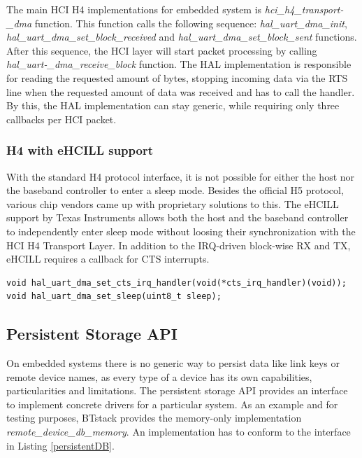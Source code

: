 \documentclass[a4paper,titlepage,oneside,12pt]{amsart} %
\begin{document}
The main HCI H4 implementations for embedded system is \emph{hci\_h4\_transport-\_dma} function. This function calls the following sequence: \emph{hal\_uart\_dma\_init}, \emph{hal\_uart\_dma\_set\_block\_received} and \emph{hal\_uart\_dma\_set\_block\_sent} functions. \mbox{After} this sequence, the HCI layer will start packet processing by calling \emph{hal\_uart-\_dma\_receive\_block} function. The HAL implementation is responsible for reading the requested amount of bytes, stopping incoming data via the RTS line when the requested amount of data was received and has to call the handler. By this, the HAL implementation can stay generic, while requiring only three callbacks per HCI packet. 

\subsubsection{H4 with eHCILL support}
With the standard H4 protocol interface, it is not possible for either the host nor the baseband controller to enter a sleep mode. Besides the official H5 protocol, various chip vendors came up with proprietary solutions to this. The eHCILL support by Texas Instruments allows both the host and the baseband controller to independently enter sleep mode without loosing their synchronization with the HCI H4 Transport Layer. In addition to the IRQ-driven block-wise RX and TX, eHCILL requires a callback for CTS interrupts.

\begin{lstlisting}
void hal_uart_dma_set_cts_irq_handler(void(*cts_irq_handler)(void));
void hal_uart_dma_set_sleep(uint8_t sleep);
\end{lstlisting}


\subsection{Persistent Storage API}
\label{section:persistent_storage}

On embedded systems there is no generic way to persist data like link keys or remote device names, as every type of a device has its own capabilities, particularities and limitations. The persistent storage API provides an interface to implement concrete drivers for a particular system. As an example and for testing purposes, BTstack provides the memory-only implementation \emph{remote\_device\_db\_memory}. An implementation has to conform to the interface in Listing \ref{persistentDB}.
\\
\end{document}
